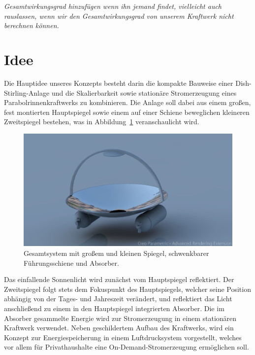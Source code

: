 \documentclass[fontsize=10pt,paper=a4,bibliography=totoc]{scrartcl}
\newcommand{\felix}[1]{{ \color{green} #1}}
\newcommand{\maxim}[1]{{ \color{blue} #1}}
\newcommand{\todo}[1]{{\color{magenta}#1}}
\begin{document}
\emph{Gesamtwirkungsgrad hinzufügen wenn ihn jemand findet, vielleicht auch rauslassen, wenn wir den Gesamtwirkungsgrad von unserem Kraftwerk nicht berechnen können.}

\section{Idee}


\maxim{
Die Hauptidee unseres Konzepts besteht darin die kompakte Bauweise einer Dish-Stirling-Anlage und die Skalierbarkeit sowie stationäre Stromerzeugung eines Parabolrinnenkraftwerks zu kombinieren. Die Anlage soll dabei aus einem großen, fest montierten Hauptspiegel sowie einem auf einer Schiene beweglichen kleineren Zweitspiegel bestehen,} \felix{ was in Abbildung~\ref{pic:system_rendered} veranschaulicht wird.}

\begin{figure}[htb]
	\centering
	\includegraphics[width=\textwidth]{images/SMALL_MIRROR}
	\caption[Gesamtsystem]{Gesamtsystem mit großem und kleinen Spiegel, schwenkbarer Führungsschiene und Absorber.}
	\label{pic:system_rendered}
\end{figure}

\maxim{Das einfallende Sonnenlicht wird zunächst vom Hauptspiegel reflektiert. Der Zweitspiegel folgt stets dem Fokuspunkt des Hauptspiegels, welcher seine Position abhängig von der Tages- und Jahreszeit verändert, und reflektiert das Licht anschließend zu einem in den Hauptspiegel integrierten Absorber.  Die im Absorber gesammelte Energie wird zur Stromerzeugung in einem stationären Kraftwerk verwendet.
\hfill\newline %
\hfill\newline
Neben geschildertem Aufbau des Kraftwerks, wird ein Konzept zur Energiespeicherung in einem Luftdrucksystem vorgestellt, welches vor allem für Privathaushalte eine On-Demand-Stromerzeugung ermöglichen soll.
}
\hfill \newline
\end{document}
